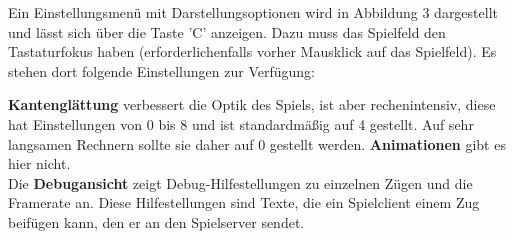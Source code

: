 \documentclass[a4paper, ngerman]{scrartcl}
\begin{document}
	Ein Einstellungsmenü mit Darstellungsoptionen wird in Abbildung 3 dargestellt
	und lässt sich über die Taste 'C' anzeigen. Dazu muss das
Spielfeld den Tastaturfokus haben (erforderlichenfalls
vorher Mausklick auf das Spielfeld). Es stehen dort
folgende Einstellungen zur Verfügung: 

\textbf{Kantenglättung} verbessert die Optik des
Spiels, ist aber rechenintensiv, diese hat Einstellungen von 0 bis 8 und ist
standardmäßig auf 4 gestellt.
Auf sehr langsamen Rechnern sollte sie daher auf 0 gestellt werden.
\textbf{Animationen} gibt es hier nicht.\\
Die \textbf{Debugansicht} zeigt Debug-Hilfestellungen zu einzelnen Zügen und
die Framerate an.
Diese Hilfestellungen sind Texte, die ein Spielclient einem Zug beifügen kann, den er
an den Spielserver sendet.
	
\end{document}
